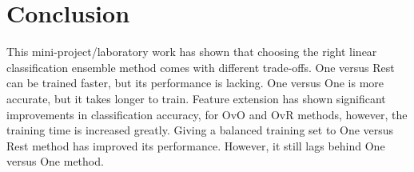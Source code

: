 \documentclass[
  a4paper,            %
  DIV=10,             %
  oneside,            %
  BCOR=5mm,           %
  parskip=half,       %
  numbers=noenddot,   %
  bibtotoc,           %
  listof=totoc,        %
  article
]{scrreprt}
\begin{document}
\section{Conclusion}
This mini-project/laboratory work has shown that choosing the right linear classification ensemble method comes with different trade-offs.
One versus Rest can be trained faster, but its performance is lacking.
One versus One is more accurate, but it takes longer to train.
Feature extension has shown significant improvements in classification accuracy, for OvO and OvR methods, however, the training time is increased greatly.
Giving a balanced training set to One versus Rest method has improved its performance.
However, it still lags behind One versus One method.
\end{document}
